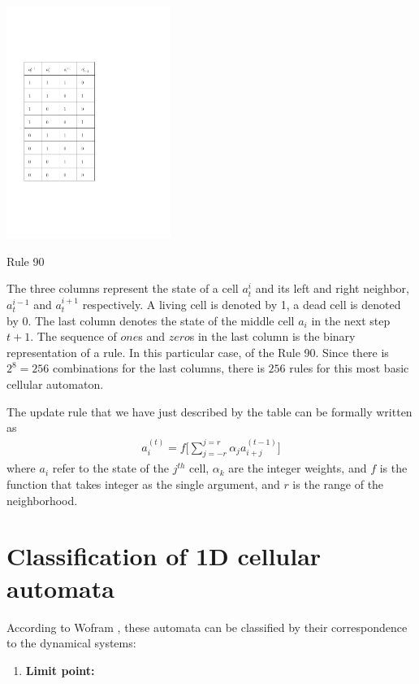 \begin{enumerate}
\begin{table}[htbp]
 \centering
 \includegraphics[width=0.4\textwidth]{./img/1Drule}
 \caption{Rule 90}
 \label{rule90}
\end{table}


The three columns represent the state of a cell $a_t^i$ and its left and right neighbor, $a_t^{i-1}$ and $a_t^{i+1}$ respectively. A living cell is denoted by 1, a dead cell is denoted by 0. The last column denotes the state of the middle cell $a_i$ in the next step $t+1$. The sequence of $one$s and $zero$s in the last column is the binary representation of a rule. In this particular case, of the Rule 90.
Since there is $2^8=256$ combinations for the last columns, there is $256$ rules for this most basic cellular automaton.

The update rule that we have just described by the table can be formally written as
\begin{align} \label{rule1}
a_i^{(t)} = f \big[ \sum_{j=-r}^{j=r} \alpha_j a_{i+j}^{(t-1)} \big]
\end{align}
where $a_i$ refer to the state of the $j^{th}$ cell, $\alpha_k$ are the integer weights, and $f$ is the function that takes integer as the single argument, and $r$ is the range of the neighborhood.

\section{Classification of 1D cellular automata}

According to Wofram \cite{wolf}, these automata can be classified by their correspondence to the dynamical systems:
\begin{enumerate}
\item \textbf{Limit point:}


\end{enumerate}
\end{enumerate}
